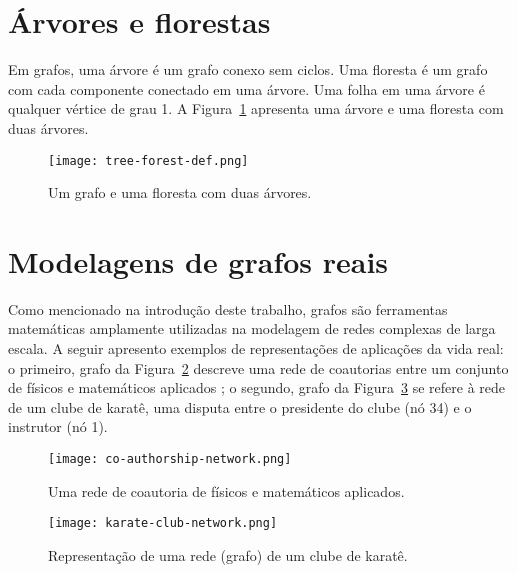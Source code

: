 \section{Árvores e florestas}
Em grafos, uma árvore é um grafo conexo sem ciclos. Uma floresta é um grafo com cada componente conectado em uma árvore. Uma folha em uma árvore é qualquer vértice de grau 1. A Figura~\ref{sec2:tree-forest-def} apresenta uma árvore e uma floresta com duas árvores.

\begin{figure}[!htb]
    \centering
    \texttt{[image: tree-forest-def.png]}
    \caption{Um grafo e uma floresta com duas árvores.}
    \label{sec2:tree-forest-def}
\end{figure}

\section{Modelagens de grafos reais}
Como mencionado na introdução deste trabalho, grafos são ferramentas matemáticas amplamente utilizadas na modelagem de
redes complexas de larga escala. A seguir apresento exemplos de representações de aplicações da vida real: o primeiro, grafo da Figura~\ref{sec2:co-authorship-network} descreve uma rede de coautorias entre um conjunto de físicos e matemáticos aplicados \cite{easley2010}; o segundo, grafo da Figura~\ref{sec2:karate-club-network} se refere à rede de um clube de karatê, uma disputa entre o presidente do clube (nó 34) e o instrutor (nó 1).

\begin{figure}[!htb]
    \centering
    \texttt{[image: co-authorship-network.png]}
    \caption{Uma rede de coautoria de físicos e matemáticos aplicados.}
    \label{sec2:co-authorship-network}
\end{figure}

\begin{figure}[!htb]
    \centering
    \texttt{[image: karate-club-network.png]}
    \caption{Representação de uma rede (grafo) de um clube de karatê.}
    \label{sec2:karate-club-network}
\end{figure}